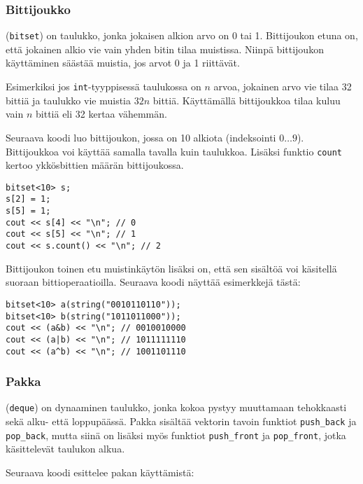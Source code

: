 \subsubsection{Bittijoukko}


 (\texttt{bitset}) on taulukko,
jonka jokaisen alkion arvo on 0 tai 1.
Bittijoukon etuna on, että jokainen alkio
vie vain yhden bitin tilaa muistissa.
Niinpä bittijoukon käyttäminen säästää muistia,
jos arvot 0 ja 1 riittävät.

Esimerkiksi jos \texttt{int}-tyyppisessä
taulukossa on $n$ arvoa,
jokainen arvo vie tilaa 32 bittiä ja taulukko
vie muistia $32n$ bittiä.
Käyttämällä bittijoukkoa tilaa
kuluu vain $n$ bittiä eli 32 kertaa vähemmän.

Seuraava koodi luo bittijoukon, jossa on 10 alkiota
(indeksointi $0 \ldots 9$).
Bittijoukkoa voi käyttää samalla tavalla kuin taulukkoa.
Lisäksi funktio \texttt{count} kertoo ykkösbittien
määrän bittijoukossa.
\begin{lstlisting}
bitset<10> s;
s[2] = 1;
s[5] = 1;
cout << s[4] << "\n"; // 0
cout << s[5] << "\n"; // 1
cout << s.count() << "\n"; // 2
\end{lstlisting}

Bittijoukon toinen etu muistinkäytön lisäksi on,
että sen sisältöä voi käsitellä suoraan bittioperaatioilla.
Seuraava koodi näyttää esimerkkejä tästä:

\begin{lstlisting}
bitset<10> a(string("0010110110"));
bitset<10> b(string("1011011000"));
cout << (a&b) << "\n"; // 0010010000
cout << (a|b) << "\n"; // 1011111110
cout << (a^b) << "\n"; // 1001101110
\end{lstlisting}

\subsubsection{Pakka}


 (\texttt{deque}) on dynaaminen taulukko,
jonka kokoa pystyy muuttamaan tehokkaasti
sekä alku- että loppupäässä.
Pakka sisältää vektorin tavoin
funktiot \texttt{push\_back}
ja \texttt{pop\_back}, mutta siinä on lisäksi myös funktiot
\texttt{push\_front} ja \texttt{pop\_front},
jotka käsittelevät taulukon alkua.

Seuraava koodi esittelee pakan käyttämistä:

